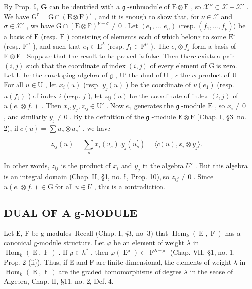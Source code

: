By Prop. 9, \(\mathbf{G}\) can be identified with a \(\mathfrak{g}\) -submodule of \(\mathrm{E} \otimes \mathrm{F}\) , so \(\mathcal{X}'' \subset \mathcal{X} + \mathcal{X}'\) . We have \(\mathrm{G}^{\tau} = \mathrm{G} \cap (\mathrm{E} \otimes \mathrm{F})^{\tau}\) , and it is enough to show that, for \(\nu \in \mathcal{X}\) and \(\sigma \in \mathcal{X}'\) , we have \(\mathrm{G} \cap (\mathrm{E} \otimes \mathrm{F})^{\nu + \sigma} \neq 0\) . Let \((e_1, \ldots, e_n)\) (resp. \((f_1, \ldots, f_p))\) be a basis of \(\mathrm{E}\) (resp. \(\mathrm{F}\) ) consisting of elements each of which belong to some \(\mathrm{E}^\nu\) (resp. \(\mathrm{F}^\sigma\) ), and such that \(e_1 \in \mathrm{E}^\lambda\) (resp. \(f_1 \in \mathrm{F}^\mu\) ). The \(e_i \otimes f_j\) form a basis of \(\mathrm{E} \otimes \mathrm{F}\) . Suppose that the result to be proved is false. Then there exists a pair \((i,j)\) such that the coordinate of index \((i,j)\) of every element of \(\mathrm{G}\) is zero. Let \(\mathrm{U}\) be the enveloping algebra of \(\mathfrak{g}\) , \(\mathrm{U}'\) the dual of \(\mathrm{U}\) , \(c\) the coproduct of \(\mathrm{U}\) . For all \(u \in \mathrm{U}\) , let \(x_i(u)\) (resp. \(y_j(u)\) ) be the coordinate of \(u(e_1)\) (resp. \(u(f_1)\) ) of index \(i\) (resp. \(j\) ); let \(z_{ij}(u)\) be the coordinate of index \((i,j)\) of \(u(e_1 \otimes f_1)\) . Then \(x_i, y_j, z_{ij} \in \mathrm{U}'\) . Now \(e_1\) generates the \(\mathfrak{g}\) -module \(\mathrm{E}\) , so \(x_i \neq 0\) , and similarly \(y_j \neq 0\) . By the definition of the \(\mathfrak{g}\) -module \(\mathrm{E} \otimes \mathrm{F}\) (Chap. I, §3, no. 2), if \(c(u) = \sum u_s \otimes u_s'\) , we have

\[
z _ {i j} (u) = \sum_ {s} x _ {i} (u _ {s}). y _ {j} (u _ {s} ^ {\prime}) = \langle c (u), x _ {i} \otimes y _ {j} \rangle .
\]

In other words, \(z_{ij}\) is the product of \(x_{i}\) and \(y_{j}\) in the algebra \(U'\) . But this algebra is an integral domain (Chap. II, §1, no. 5, Prop. 10), so \(z_{ij} \neq 0\) . Since \(u(e_{1} \otimes f_{1}) \in \mathrm{G}\) for all \(u \in U\) , this is a contradiction.

\subsection{DUAL OF A g-MODULE}

Let E, F be g-modules. Recall (Chap. I, §3, no. 3) that \(\operatorname{Hom}_{k}(\operatorname{E},\operatorname{F})\) has a canonical g-module structure. Let \(\varphi\) be an element of weight \(\lambda\) in \(\operatorname{Hom}_{k}(\operatorname{E},\operatorname{F})\) . If \(\mu \in h^{*}\) , then \(\varphi(\operatorname{E}^{\mu}) \subset \operatorname{F}^{\lambda + \mu}\) (Chap. VII, §1, no. 1, Prop. 2 (ii)). Thus, if E and F are finite dimensional, the elements of weight \(\lambda\) in \(\operatorname{Hom}_{k}(\operatorname{E},\operatorname{F})\) are the graded homomorphisms of degree \(\lambda\) in the sense of Algebra, Chap. II, §11, no. 2, Def. 4.

